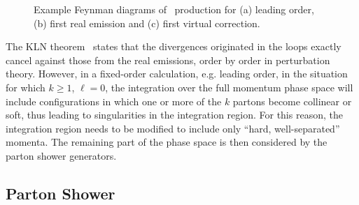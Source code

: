 \begin{figure}[t!]
\begin{subfigure}{0.32\textwidth}
  \caption{}\end{subfigure}
  \caption{Example Feynman diagrams of \ttbar\ production for (a) leading order, (b) first real emission and (c) first virtual correction.}
  \label{fig:tt_jets}
\end{figure}

The KLN theorem~\cite{KLN1,KLN2} states that the divergences originated in the loops exactly cancel against those from the real emissions, order by order in perturbation theory.
However, in a fixed-order calculation, e.g. leading order, in the situation for which $k\geq1$, $\ell=0$, the integration over the full momentum phase space will include configurations in which one or more of the $k$ partons become collinear or soft, thus leading to singularities in the integration region.
For this reason, the integration region needs to be modified to include only ``hard, well-separated'' momenta.
The remaining part of the phase space is then considered by the parton shower generators.

\subsection{Parton Shower}

